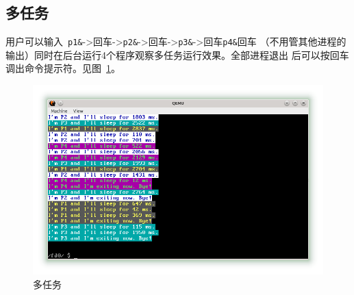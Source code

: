 \documentclass[a4paper, adobefonts]{ctexart}
\begin{document}
\subsection{多任务}
用户可以输入~\verb|p1&|->回车->\verb|p2&|->回车->\verb|p3&|->回车\verb|p4&|回车
（不用管其他进程的输出）同时在后台运行4个程序观察多任务运行效果。全部进程退出
后可以按回车调出命令提示符。见图~\ref{fig:multi}。

\begin{figure}[htp!]
    \center
    \includegraphics[scale=0.72]{2.png}
    \caption{多任务}\label{fig:multi}
\end{figure}
\end{document}
